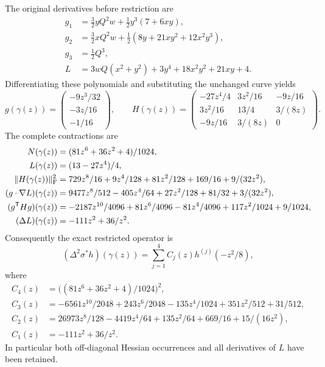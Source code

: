 The original derivatives before restriction are
\begin{align*}
 g_1&=\tfrac32yQ^2w+\tfrac12y^3(7+6xy),\\
 g_2&=\tfrac32xQ^2w+\tfrac12(8y+21xy^2+12x^2y^3),\\
 g_3&=\tfrac12Q^3,\\
 L&=3wQ(x^2+y^2)+3y^4+18x^2y^2+21xy+4.
\end{align*}
Differentiating these polynomials and substituting the unchanged
curve yields
\[
 g(\gamma(z))=
 \begin{pmatrix}-9z^3/32\\-3z/16\\-1/16\end{pmatrix},
 \qquad
 H(\gamma(z))=
 \begin{pmatrix}
 -27z^4/4&3z^2/16&-9z/16\\
 3z^2/16&13/4&3/(8z)\\
 -9z/16&3/(8z)&0
 \end{pmatrix}.
\]
The complete contractions are
\begin{align*}
 N(\gamma(z))&=(81z^6+36z^2+4)/1024,\\
 L(\gamma(z))&=(13-27z^4)/4,\\
 \|H(\gamma(z))\|_{\rm F}^2
  &=729z^8/16+9z^4/128+81z^2/128+169/16+9/(32z^2),\\
 (g\cdot\nabla L)(\gamma(z))
  &=9477z^8/512-405z^4/64+27z^2/128+81/32+3/(32z^2),\\
 (g^{\mathsf T}Hg)(\gamma(z))
  &=-2187z^{10}/4096+81z^6/4096
       -81z^4/4096+117z^2/1024+9/1024,\\
 (\Delta L)(\gamma(z))&=-111z^2+36/z^2.
\end{align*}
Consequently the exact restricted operator is
\begin{equation}
 (\Delta^2\sigma^*h)(\gamma(z))
   =\sum_{j=1}^4 C_j(z)h^{(j)}(-z^2/8),
 \label{eq:cq-bilaplacian-all-coefficients}
\end{equation}
where
\begin{align*}
 C_4(z)&=\bigl((81z^6+36z^2+4)/1024\bigr)^2,\\
 C_3(z)&=-6561z^{10}/2048+243z^6/2048
             -135z^4/1024+351z^2/512+31/512,\\
 C_2(z)&=26973z^8/128-4419z^4/64
             +135z^2/64+669/16+15/(16z^2),\\
 C_1(z)&=-111z^2+36/z^2.
\end{align*}
In particular both off-diagonal Hessian occurrences and all
derivatives of $L$ have been retained.

